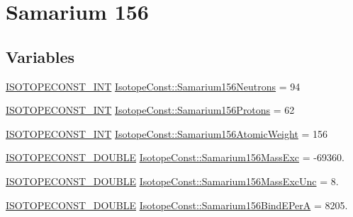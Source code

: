 \hypertarget{group___isotope_const-_samarium-_sm156}{}\section{Samarium 156}
\label{group___isotope_const-_samarium-_sm156}
\subsection*{Variables}
\begin{DoxyCompactItemize}
\item 
\mbox{\hyperlink{group___isotope_const-_macros_ga5f18360b3e99483a35c32d789e62621c}{I\+S\+O\+T\+O\+P\+E\+C\+O\+N\+S\+T\+\_\+\+I\+NT}} \mbox{\hyperlink{group___isotope_const-_samarium-_sm156_ga506c8afc74a14755adeb52feae1e5532}{Isotope\+Const\+::\+Samarium156\+Neutrons}} = 94
\item 
\mbox{\hyperlink{group___isotope_const-_macros_ga5f18360b3e99483a35c32d789e62621c}{I\+S\+O\+T\+O\+P\+E\+C\+O\+N\+S\+T\+\_\+\+I\+NT}} \mbox{\hyperlink{group___isotope_const-_samarium-_sm156_gadf73b6640faaa460ba67560850e86766}{Isotope\+Const\+::\+Samarium156\+Protons}} = 62
\item 
\mbox{\hyperlink{group___isotope_const-_macros_ga5f18360b3e99483a35c32d789e62621c}{I\+S\+O\+T\+O\+P\+E\+C\+O\+N\+S\+T\+\_\+\+I\+NT}} \mbox{\hyperlink{group___isotope_const-_samarium-_sm156_ga34cd65a7827e1786177dbe08d3cddd87}{Isotope\+Const\+::\+Samarium156\+Atomic\+Weight}} = 156
\item 
\mbox{\hyperlink{group___isotope_const-_macros_ga8f45a7272ce02c0b4c65c44636ed719a}{I\+S\+O\+T\+O\+P\+E\+C\+O\+N\+S\+T\+\_\+\+D\+O\+U\+B\+LE}} \mbox{\hyperlink{group___isotope_const-_samarium-_sm156_ga4c71489ee6113dc670b3194f30a0ce06}{Isotope\+Const\+::\+Samarium156\+Mass\+Exc}} = -\/69360.
\item 
\mbox{\hyperlink{group___isotope_const-_macros_ga8f45a7272ce02c0b4c65c44636ed719a}{I\+S\+O\+T\+O\+P\+E\+C\+O\+N\+S\+T\+\_\+\+D\+O\+U\+B\+LE}} \mbox{\hyperlink{group___isotope_const-_samarium-_sm156_ga57d8135caf6af25b44ca949405c6848d}{Isotope\+Const\+::\+Samarium156\+Mass\+Exc\+Unc}} = 8.
\item 
\mbox{\hyperlink{group___isotope_const-_macros_ga8f45a7272ce02c0b4c65c44636ed719a}{I\+S\+O\+T\+O\+P\+E\+C\+O\+N\+S\+T\+\_\+\+D\+O\+U\+B\+LE}} \mbox{\hyperlink{group___isotope_const-_samarium-_sm156_ga23eaf315aa8e338bd1d4f89cf1632406}{Isotope\+Const\+::\+Samarium156\+Bind\+E\+PerA}} = 8205.
\item 

\end{DoxyCompactItemize}

